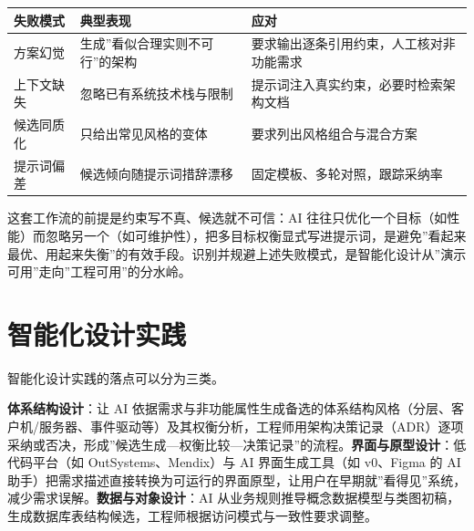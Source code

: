 \documentclass[12pt,a4paper,twoside,openany]{ctexbook}
\numberwithin{figure}{chapter}
\numberwithin{table}{chapter}
\newcounter{none}
\begin{document}
{\def\LTcaptype{none} %
\begin{longtable}[]{@{}
  >{\raggedright\arraybackslash}p{}
  >{\raggedright\arraybackslash}p{}
  >{\raggedright\arraybackslash}p{}@{}}
\toprule\noalign{}
\begin{minipage}[b]{\linewidth}\raggedright
失败模式
\end{minipage} & \begin{minipage}[b]{\linewidth}\raggedright
典型表现
\end{minipage} & \begin{minipage}[b]{\linewidth}\raggedright
应对
\end{minipage} \\
\midrule\noalign{}
\endhead
\bottomrule\noalign{}
\endlastfoot
方案幻觉 & 生成''看似合理实则不可行''的架构 &
要求输出逐条引用约束，人工核对非功能需求 \\
上下文缺失 & 忽略已有系统技术栈与限制 &
提示词注入真实约束，必要时检索架构文档 \\
候选同质化 & 只给出常见风格的变体 & 要求列出风格组合与混合方案 \\
提示词偏差 & 候选倾向随提示词措辞漂移 &
固定模板、多轮对照，跟踪采纳率 \\
\end{longtable}
}

这套工作流的前提是约束写不真、候选就不可信：AI
往往只优化一个目标（如性能）而忽略另一个（如可维护性），把多目标权衡显式写进提示词，是避免''看起来最优、用起来失衡''的有效手段。识别并规避上述失败模式，是智能化设计从''演示可用''走向''工程可用''的分水岭。

\section{智能化设计实践}\label{ux667aux80fdux5316ux8bbeux8ba1ux5b9eux8df5}

智能化设计实践的落点可以分为三类。

\textbf{体系结构设计}：让 AI
依据需求与非功能属性生成备选的体系结构风格（分层、客户机/服务器、事件驱动等）及其权衡分析，工程师用架构决策记录（ADR）逐项采纳或否决，形成''候选生成---权衡比较---决策记录''的流程。\textbf{界面与原型设计}：低代码平台（如
OutSystems、Mendix）与 AI 界面生成工具（如 v0、Figma 的 AI
助手）把需求描述直接转换为可运行的界面原型，让用户在早期就''看得见''系统，减少需求误解。\textbf{数据与对象设计}：AI
从业务规则推导概念数据模型与类图初稿，生成数据库表结构候选，工程师根据访问模式与一致性要求调整。
\end{document}
